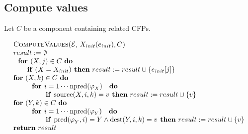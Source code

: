 \subsection{Compute values}

Let $C$ be a component containing related CFPs.

\begin{equation*}
\begin{tabular}{l}
\textsc{ComputeValues(}$\mathcal{E}$, $X_{init}(e_{init}),C$\textsc{)} \\ 
$result:=$ $\emptyset $ \\ 
$\text{\textbf{for }}(X,j)\in C$ \textbf{do} \\ 
$\qquad $\textbf{if} $(X=X_{init})$\textbf{\ then} $result:=result\cup
\{e_{init}[j]\}$ \\ 
\textbf{for} $(X,k)\in C$ \textbf{do} \\ 
$\qquad \text{\textbf{for }}i=1\cdots \mathrm{npred}(\varphi _{X})\text{ 
\textbf{do}}$ \\ 
$\qquad \qquad \text{\textbf{if }}\mathrm{source}(X,i,k)=v$\textbf{\ then} $%
result:=result\cup \{v\}$ \\ 
\textbf{for} $(Y,k)\in C$ \textbf{do} \\ 
$\qquad \text{\textbf{for }}i=1\cdots \mathrm{npred}(\varphi _{Y})\text{ 
\textbf{do}}$ \\ 
$\qquad \qquad \text{\textbf{if }}\mathrm{pred}(\varphi _{Y},i)=Y\wedge 
\mathrm{dest}(Y,i,k)=v$\textbf{\ then} $result:=result\cup \{v\}$ \\ 
\textbf{return} $result$%
\end{tabular}%
\end{equation*}

